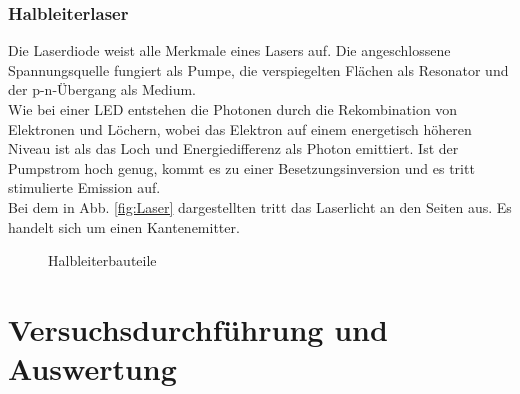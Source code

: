 \documentclass[twoside,colorback,accentcolor=tud4c,11pt]{tudreport}
\begin{document}
\subsection{Halbleiterlaser}\label{laser}
Die Laserdiode weist alle Merkmale eines Lasers auf. Die angeschlossene Spannungsquelle fungiert als Pumpe, die verspiegelten Flächen als Resonator und der p-n-Übergang als Medium.\\
Wie bei einer LED entstehen die Photonen durch die Rekombination von Elektronen und Löchern, wobei das Elektron auf einem energetisch höheren Niveau ist als das Loch und Energiedifferenz als Photon emittiert. Ist der Pumpstrom hoch genug, kommt es zu einer Besetzungsinversion und es tritt stimulierte Emission auf.\\
Bei dem in Abb. \ref{fig:Laser} dargestellten tritt das Laserlicht an den Seiten aus. Es handelt sich um einen Kantenemitter.
\begin{figure}[H]
  \centering
    \quad 
  \quad   
  \caption{Halbleiterbauteile}
  \label{fig:halbleiter}
\end{figure}
\chapter{Versuchsdurchführung und Auswertung}
\end{document}
